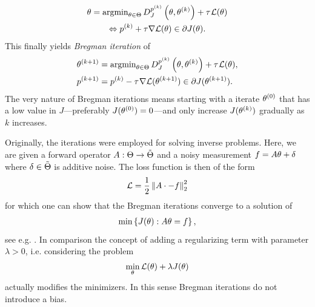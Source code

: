 %
\begin{gather}
	\theta = \operatorname{argmin}_{\theta\in\Theta} D^{p^{(k)}}_J\left(\theta,\theta^{(k)}\right) + \tau^{}\mathcal{L}(\theta)
	\\
	\Leftrightarrow
	p^{(k)} + \tau\nabla\mathcal{L}(\theta)\in \partial J(\theta). 
\end{gather}
%
This finally yields \emph{Bregman iteration} of \cite{osher2005iterative}
%
%
\begin{subequations}\label{eq:bregman_iteration}
	\begin{align}
		\theta^{(k+1)} &= \operatorname{argmin}_{\theta\in\Theta} D^{p^{(k)}}_J\left(\theta,\theta^{(k)}\right) + \tau^{}\mathcal{L}(\theta), \\
		p^{(k+1)} &= p^{(k)} - \tau^{}\nabla\mathcal{L}(\theta^{(k+1)}) \in \partial J(\theta^{(k+1)}).
	\end{align}
\end{subequations}
%
The very nature of Bregman iterations means starting with a iterate $\theta^{(0)}$ that has a low value in $J$---preferably $J(\theta^{(0)}) = 0$---and only increase $J(\theta^{(k)})$ gradually as $k$ increases.
%
\begin{remark}{}{}
	Originally, the iterations were employed for solving inverse problems. Here, we are given a forward operator $A:\Theta\to\tilde{\Theta}$ and a noisy measurement $f= A\theta +\delta$ where $\delta\in \tilde{\Theta}$ is additive noise. The loss function is then of the form
	\begin{align*}
		\mathcal{L} = \frac{1}{2}\left\|A\cdot - f\right\|^2_2
	\end{align*}
	for which one can show that the Bregman iterations converge to a solution of
	\begin{align}\label{eq:Bregexact}
		\min \left\{J(\theta): A\theta = f\right\},
	\end{align}
	see e.g. \cite{osher2005iterative}. In comparison the concept of adding a regularizing term with parameter $\lambda>0$, i.e. considering the problem
	\begin{align*}
		\min_\theta \mathcal{L}(\theta) + \lambda J(\theta) 
	\end{align*}
	actually modifies the minimizers. In this sense Bregman iterations do not introduce a bias.
\end{remark}
%
%
